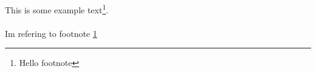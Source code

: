 \documentclass{article}
\begin{document}
This is some example text\footnote{\label{myfootnote}Hello footnote}.\\\\

Im refering to footnote \ref{myfootnote}
\end{document}
